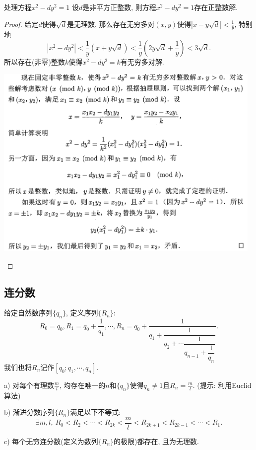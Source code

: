 \begin{theorem}{处理方程$x^2-dy^2=1$}
	设$d$是非平方正整数, 则方程$x^2-dy^2=1$存在正整数解. 
\end{theorem}
\begin{proof}
	给定$d$使得$\sqrt{d}$是无理数, 那么存在无穷多对$(x,y)$使得$|x-y\sqrt{d} |<\frac{1}{y}$, 特别地$$|x^2-dy^2| < \frac{1}{y}(x+y\sqrt{d}) < \frac{1}{y}(2y\sqrt{d} + \frac{1}{y}) < 3\sqrt{d}.$$
	所以存在(非零)整数$k$使得$x^2-dy^2=k$有无穷多对解. 
	
	\begin{center}
		\includegraphics[width=13cm]{attachment/iShot_2024-01-06_21.53.15.png}
	\end{center}
\end{proof}

\subsection{连分数}

给定自然数序列$\{ q_n \}$, 定义序列$\{ R_n \}$: $$R_0=q_0, R_1=q_0+\frac{1}{q_1}, \cdots ,R_n = q_0 + \dfrac{1}{q_1 
          + \dfrac{1}{q_2 
          + \cdots \dfrac{1}{q_{n-1}+\dfrac{1}{q_n}}  } }.$$
我们也将$R_n$记作$[q_0;q_1,\cdots ,q_n]$. 


a) 对每个有理数$\frac{m}{l}$, 均存在唯一的$n$和$\{ q_n \}$使得$q_n \neq 1$且$R_n=\frac{m}{l}$. (提示: 利用Euclid算法)

b) 渐进分数序列$\{ R_n \}$满足以下不等式: $$\exists m,l,~ R_0<R_2< \cdots <R_{2k} < \frac{m}{l} < R_{2k+1} < R_{2k-1} < \cdots < R_1.$$

c) 每个无穷连分数(定义为数列$\{ R_n \}$的极限)都存在, 且为无理数. 

